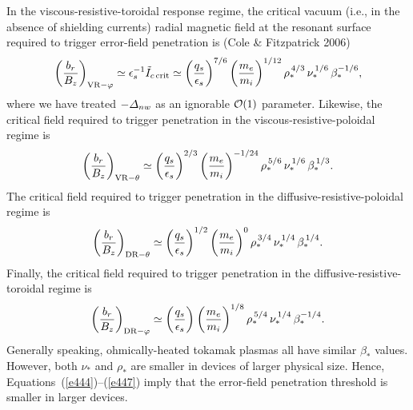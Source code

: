 \documentclass[notitlepage,12pt]{article}
\begin{document}
In the viscous-resistive-toroidal response regime, the critical vacuum (i.e., in the absence of shielding currents) radial magnetic
field at the resonant surface required to
trigger error-field penetration is (Cole \& Fitzpatrick 2006)
\begin{equation}\label{e444}
\left(\frac{b_{r}}{B_z}\right)_{{\rm VR}-\varphi} \simeq \epsilon_s^{-1}\tilde{I}_{c\,{\rm crit}}\simeq \left(\frac{q_s}{\epsilon_s}\right)^{7/6}\left(\frac{m_e}{m_i}\right)^{1/12}
\rho_\ast^{\,4/3}\,\nu_\ast^{\,1/6}\,\beta_\ast^{-1/6},
\end{equation}
where we have treated $-{\mit\Delta}_{nw}$ as an ignorable ${\cal O}(1)$ parameter. Likewise,  the critical
field required to trigger penetration in the viscous-resistive-poloidal regime is
\begin{equation}
\left(\frac{b_{r}}{B_z}\right)_{{\rm VR}-\theta} \simeq  \left(\frac{q_s}{\epsilon_s}\right)^{2/3}\left(\frac{m_e}{m_i}\right)^{-1/24}
\rho_\ast^{\,5/6}\,\nu_\ast^{\,1/6}\,\beta_\ast^{\,1/3}.
\end{equation}
The critical field required to trigger penetration in the diffusive-resistive-poloidal regime is
\begin{equation}
\left(\frac{b_{r}}{B_z}\right)_{{\rm DR}-\theta} \simeq  \left(\frac{q_s}{\epsilon_s}\right)^{1/2}\left(\frac{m_e}{m_i}\right)^{0}
\rho_\ast^{\,3/4}\,\nu_\ast^{\,1/4}\,\beta_\ast^{\,1/4}.
\end{equation}
Finally, the critical field 
required to  trigger penetration in the diffusive-resistive-toroidal regime is
\begin{equation}
\left(\frac{b_{r}}{B_z}\right)_{{\rm DR}-\varphi} \simeq  \left(\frac{q_s}{\epsilon_s}\right)^{}\left(\frac{m_e}{m_i}\right)^{1/8}
\rho_\ast^{\,5/4}\,\nu_\ast^{\,1/4}\,\beta_\ast^{-1/4}.\label{e447}
\end{equation}
Generally speaking, ohmically-heated tokamak plasmas all  have similar $\beta_\ast$ values. However,
both $\nu_\ast$ and $\rho_\ast$ are smaller in devices of larger physical size. Hence, Equations~(\ref{e444})--(\ref{e447})
imply that the error-field penetration threshold is smaller in larger devices. 
\end{document}
